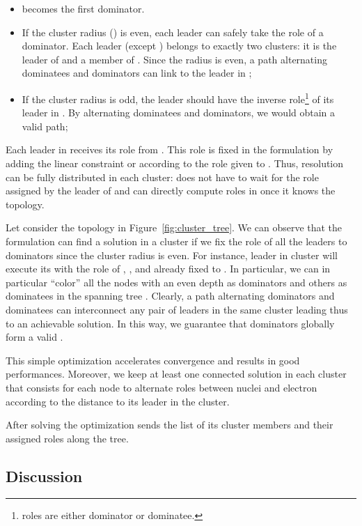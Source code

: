 \documentclass[twoside]{article}
\begin{document}
\begin{itemize}
\item  becomes the first dominator.
	
\item If the cluster radius () is even, each leader can safely take
  the role of a dominator. Each leader  (except
  ) belongs to exactly two clusters: it is the leader of
   and a member of . Since the radius is
  even, a path alternating dominatees and dominators can link
   to the leader in ;

\item If the cluster radius is odd, the leader  should
  have the inverse role\footnote{roles are either dominator or
    dominatee.\label{footnote:inverse_roles}} of its leader in
  . By alternating dominatees and dominators, we
  would obtain a valid path;
\end{itemize}

Each leader  in  receives its role from
. This role is fixed in the \milp formulation by
adding the linear constraint  or
 according to the role given to
. Thus, \milp resolution can be fully distributed in each
cluster:  does not have to wait for the role assigned by the leader
of  and can directly compute roles in 
once it knows the topology.

Let consider the topology in Figure~\ref{fig:cluster_tree}. We can
observe that the \milp formulation can find a solution in a cluster if
we fix the role of all the leaders to dominators since the cluster
radius is even. For instance, leader  in cluster  will execute
its \milp with the role of , , and  already fixed to
. In particular, we can in particular ``color'' all the
nodes with an even depth as dominators and others as dominatees in the
spanning tree . Clearly, a path alternating dominators and
dominatees can interconnect any pair of leaders in the same cluster
leading thus to an achievable solution. In this way, we guarantee that
dominators globally form a valid \rwcds.

This simple optimization accelerates convergence and results in good
performances. Moreover, we keep at least one connected solution in
each cluster that consists for each node to alternate roles between
nuclei and electron according to the distance to its leader in the
cluster.

After solving the \milp optimization  sends the list of its
cluster members and their assigned roles along the tree.

\subsection{Discussion}
\end{document}
